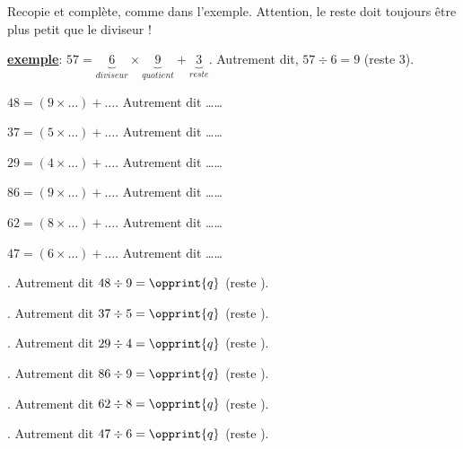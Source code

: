 Recopie et complète, comme dans l'exemple. Attention, le reste doit
toujours être plus petit que le diviseur !
\par\underline{\bf{exemple}}: $57=\underbrace{6}_{diviseur}\times
\underbrace{9}_{quotient}+\underbrace{3}_{reste}$. Autrement dit,
$57\div6=9$ (reste 3).
\par
\begin{multicols}{2}
\begin{myenumerate}
\item $48=(9\times \dots)+\dots$. Autrement dit \ldots\ldots
\item $37=(5\times \dots)+\dots$. Autrement dit \ldots\ldots
\item $29=(4\times \dots)+\dots$. Autrement dit \ldots\ldots
\item $86=(9\times \dots)+\dots$. Autrement dit \ldots\ldots
\item $62=(8\times \dots)+\dots$. Autrement dit \ldots\ldots
\item $47=(6\times \dots)+\dots$. Autrement dit \ldots\ldots
\end{myenumerate}
\end{multicols}
\begin{multicols}{2}
\begin{myenumerate}
\item {}. Autrement dit $48\div9=\opprint{q}$ (reste ).
\item {}. Autrement dit $37\div5=\opprint{q}$ (reste ).
\item {}. Autrement dit $29\div4=\opprint{q}$ (reste ).
\item {}. Autrement dit $86\div9=\opprint{q}$ (reste ).
\item {}. Autrement dit $62\div8=\opprint{q}$ (reste ).
\item {}. Autrement dit $47\div6=\opprint{q}$ (reste ).
\end{myenumerate}
\end{multicols}